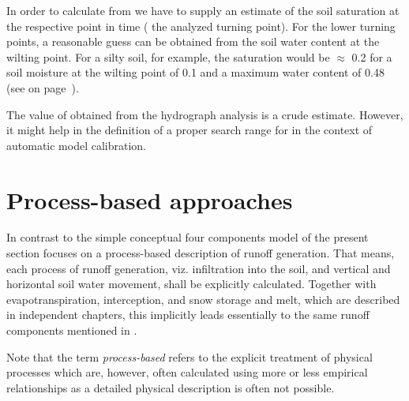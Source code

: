 In order to calculate \facBase{} from  we have to supply an estimate of the soil saturation \relSat{} at the respective point in time (\ie{} the analyzed turning point). For the lower turning points, a reasonable guess can be obtained from the soil water content at the wilting point. For a silty soil, for example, the saturation \relSat{} would be $\approx$ 0.2 for a soil moisture at the wilting point of 0.1 and a maximum water content of 0.48 (see  on page~\pageref{tab:eta:soilmoisture}).

The value of \facBase{} obtained from the hydrograph analysis is a crude estimate. However, it might help in the definition of a proper search range for \facBase{} in the context of automatic model calibration.








\section{Process-based approaches} \label{sec:rungen:proc}

In contrast to the simple conceptual four components model of  the present section focuses on a process-based description of runoff generation. That means, each process of runoff generation, viz. infiltration into the soil, and vertical and horizontal soil water movement, shall be explicitly calculated. Together with evapotranspiration, interception, and snow storage and melt, which are described in independent chapters, this implicitly leads essentially to the same runoff components mentioned in . 

Note that the term \emph{process-based} refers to the explicit treatment of physical processes which are, however, often calculated using more or less empirical relationships as a detailed physical description is often not possible.





